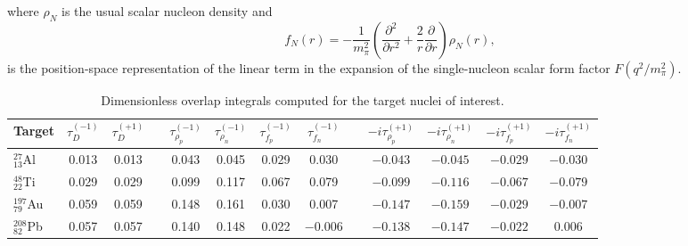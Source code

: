 \documentclass[12pt,letterpaper]{book}
\begin{document}
where $\rho_N$ is the usual scalar nucleon density and
\begin{equation}
f_N(r)=-\frac{1}{m_{\pi}^2}\left(\frac{\partial^2}{\partial r^2}+\frac{2}{r}\frac{\partial}{\partial r}\right)\rho_N(r),
\end{equation}
is the position-space representation of the linear term in the expansion of the single-nucleon scalar form factor $F(q^2/m_{\pi}^2)$.
\begin{table}
\centering
{\renewcommand{\arraystretch}{1.5}
\footnotesize
\begin{tabular}{lcccccccccccc}
\hline
\hline
Target & $\tau_D^{(-1)}$ & $\tau_D^{(+1)}$ & & $\tau_{\rho_p}^{(-1)}$ & $\tau_{\rho_n}^{(-1)}$ & $\tau_{f_p}^{(-1)}$ & $\tau_{f_n}^{(-1)}$ & & $-i\tau_{\rho_p}^{(+1)}$ & $-i\tau_{\rho_n}^{(+1)}$ & $-i\tau_{f_p}^{(+1)}$ & $-i\tau_{f_n}^{(+1)}$\\
\hline
$^{27}_{13}$Al & 0.013 & 0.013 & & 0.043 & 0.045 & 0.029 & 0.030 & & $-0.043$ & $-0.045$ & $-0.029$ & $-0.030$ \\
$^{48}_{22}$Ti & 0.029 & 0.029 & & 0.099 & 0.117 & 0.067 & 0.079 & & $-0.099$ & $-0.116$ & $-0.067$ & $-0.079$ \\
$^{197}_{79}$Au & 0.059 & 0.059 & & 0.148 & 0.161 & 0.030 & 0.007 & & $-0.147$ & $-0.159$ & $-0.029$ & $-0.007$\\
$^{208}_{82}$Pb & 0.057 & 0.057 & & 0.140 & 0.148 & 0.022 & $-0.006$ & & $-0.138$ & $-0.147$ & $-0.022$ & $0.006$\\ 
\hline
\hline
\end{tabular}
}
\caption{Dimensionless overlap integrals computed for the target nuclei of interest.}
\label{tab:overlaps}
\end{table}
\end{document}

